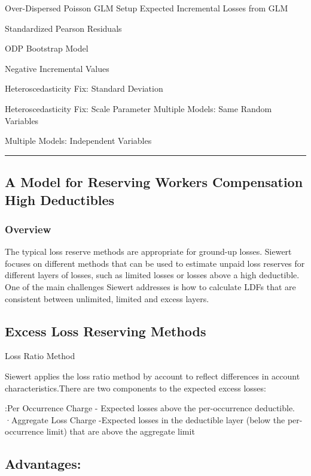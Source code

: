 \documentclass[
]{article}
\begin{document}
Over-Dispersed Poisson GLM Setup Expected Incremental Losses from GLM

Standardized Pearson Residuals

ODP Bootstrap Model

Negative Incremental Values

Heteroscedasticity Fix: Standard Deviation

Heteroscedasticity Fix: Scale Parameter Multiple Models: Same Random
Variables

Multiple Models: Independent Variables

\begin{center}\rule{0.5\linewidth}{0.5pt}\end{center}

\subsection{A Model for Reserving Workers Compensation High
Deductibles}\label{a-model-for-reserving-workers-compensation-high-deductibles}

\subsubsection{Overview}\label{overview-7}

The typical loss reserve methods are appropriate for ground-up losses.
Siewert focuses on different methods that can be used to estimate unpaid
loss reserves for different layers of losses, such as limited losses or
losses above a high deductible. One of the main challenges Siewert
addresses is how to calculate LDFs that are consistent between
unlimited, limited and excess layers.

\subsection{Excess Loss Reserving
Methods}\label{excess-loss-reserving-methods}

Loss Ratio Method

Siewert applies the loss ratio method by account to reflect differences
in account characteristics.There are two components to the expected
excess losses:

:Per Occurrence Charge - Expected losses above the per-occurrence
deductible. ·Aggregate Loss Charge -Expected losses in the deductible
layer (below the per-occurrence limit) that are above the aggregate
limit

\subsection{Advantages:}\label{advantages-4}
\end{document}
